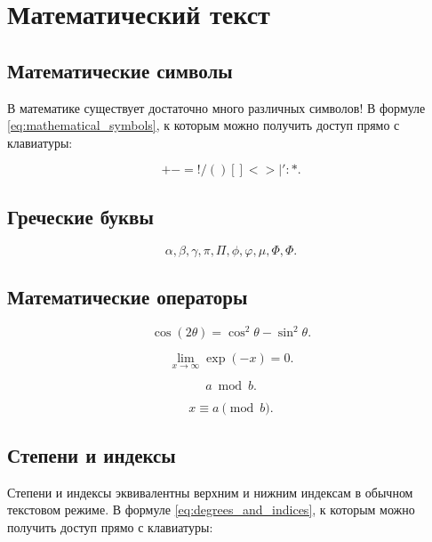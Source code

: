 \section{Математический текст}

\subsection{Математические символы}

В математике существует достаточно много различных символов! В формуле \eqref{eq:mathematical_symbols}, к которым можно получить доступ прямо с клавиатуры: 

\begin{equation} \label{eq:mathematical_symbols}
+ - = ! / ( ) [ ] < > | ' : *.
\end{equation}

\subsection{Греческие буквы}
\begin{equation}
\alpha, \beta, \gamma, \pi, \Pi, \phi, \varphi, \mu, \Phi, \varPhi.
\end{equation}

\subsection{Математические операторы}
\begin{equation}\label{eq:test}
\cos (2\theta) = \cos^2 \theta - \sin^2 \theta. 
\end{equation}

\begin{equation}
\lim\limits_{x \to \infty} \exp(-x) = 0. 
\end{equation}

\begin{equation}
a \bmod b. 
\end{equation}

\begin{equation}
x \equiv a \pmod{b}.
\end{equation}

\subsection{Степени и индексы}
Степени и индексы эквивалентны верхним и нижним индексам в обычном текстовом режиме. В формуле \eqref{eq:degrees_and_indices}, к которым можно получить доступ прямо с клавиатуры: 

